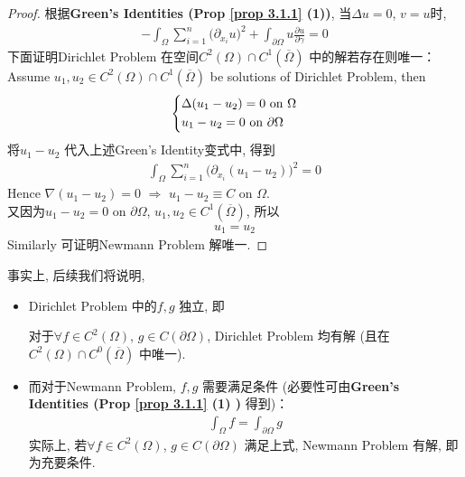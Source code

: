 \begin{proposition}
		\begin{proof}
			根据\textbf{Green's Identities (Prop \ref{prop 3.1.1} (1))}, 当$\Delta u = 0$, $v = u$时, 
			\begin{align*}
				-\int_{\Omega} \sum_{i = 1}^n \Big( \partial_{x_i} u \Big)^2 + \int_{\partial \Omega} u \frac{\partial u}{\partial \gamma} = 0
			\end{align*}
			下面证明Dirichlet Problem 在空间$C^2(\Omega) \cap C^1 \left( \overline{\Omega} \right)$ 中的解若存在则唯一：\\
			Assume $u_1 , u_2 \in C^2(\Omega) \cap C^1 \left( \overline{\Omega} \right)$ be solutions of Dirichlet Problem, then
			\begin{align*}
				\begin{dcases*}
					\Delta (u_1 - u_2) = 0 \,\, \text{on} \,\, \Omega \\
					u_1 - u_2 = 0 \,\, \text{on} \,\, \partial \Omega
				\end{dcases*}
			\end{align*}
			将$u_1 - u_2$ 代入上述Green's Identity变式中, 得到
			\begin{align*}
				\int_{\Omega} \sum_{i = 1}^n \Big( \partial_{x_i} (u_1 - u_2) \Big)^2 = 0
			\end{align*}
			Hence $\nabla(u_1 - u_2) = 0 \,\, \Rightarrow \,\, u_1 - u_2 \equiv C$ on $\Omega$. \\
			又因为$u_1 - u_2 = 0$ on $\partial \Omega$, $u_1 , u_2 \in C^1(\overline{\Omega})$, 所以
			\begin{align*}
				u_1 = u_2
			\end{align*}
			Similarly 可证明Newmann Problem \textbf{}解唯一. 
		\end{proof}
	\end{proposition}

	\newpage
	
	事实上, 后续我们将说明, 
	
	\vspace*{1em}
	
	\begin{itemize}
		\item Dirichlet Problem 中的$f , g$ 独立, 即
		\begin{center}
			对于$\forall f \in C^2(\Omega)$, $g \in C(\partial \Omega)$, Dirichlet Problem 均有解 (且在$C^2(\Omega) \cap C^0(\overline{\Omega})$ 中唯一). 
		\end{center}
		
		\vspace*{4em}
		
		\item 而对于Newmann Problem, $f , g$ 需要满足条件 (必要性可由\textbf{Green's Identities (Prop \ref{prop 3.1.1} (1) )} 得到)：
		\begin{align*}
			\int_{\Omega} f = \int_{\partial \Omega} g
		\end{align*}
		实际上, 若$\forall f \in C^2(\Omega)$, $g \in C(\partial \Omega)$ 满足上式, Newmann Problem 有解, 即为充要条件. 
	\end{itemize}

